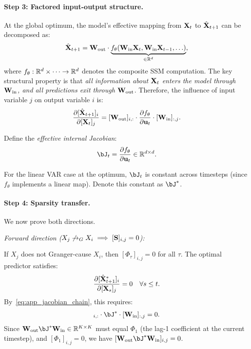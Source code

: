 \paragraph{Step 3: Factored input-output structure.}
At the global optimum, the model's effective mapping from $\mathbf{X}_t$ to
$\hat{\mathbf{X}}_{t+1}$ can be decomposed as:
\begin{equation}
    \hat{\mathbf{X}}_{t+1} = \mathbf{W}_{\text{out}} \cdot
    \underbrace{f_\theta(\mathbf{W}_{\text{in}} \mathbf{X}_t, \mathbf{W}_{\text{in}}
    \mathbf{X}_{t-1}, \ldots)}_{\in \mathbb{R}^d} ,
    \label{eq:app_factored}
\end{equation}
where $f_\theta: \mathbb{R}^d \times \cdots \to \mathbb{R}^d$ denotes the composite
SSM computation. The key structural property is that \emph{all
information about $\mathbf{X}_t$ enters the model through $\mathbf{W}_{\text{in}}$,
and all predictions exit through $\mathbf{W}_{\text{out}}$}. Therefore, the
influence of input variable $j$ on output variable $i$ is:
\begin{equation}
    \frac{\partial [\hat{\mathbf{X}}_{t+1}]_i}{\partial [\mathbf{X}_t]_j}
    = [\mathbf{W}_{\text{out}}]_{i,:} \cdot
    \frac{\partial f_\theta}{\partial \mathbf{u}_t}
    \cdot [\mathbf{W}_{\text{in}}]_{:,j}.
    \label{eq:app_jacobian_chain}
\end{equation}

Define the \emph{effective internal Jacobian}:
\begin{equation}
    \bJ_t = \frac{\partial f_\theta}{\partial \mathbf{u}_t}
    \in \R^{d \times d}.
\end{equation}

For the linear VAR case at the optimum, $\bJ_t$ is constant across
timesteps (since $f_\theta$ implements a linear map). Denote this
constant as $\bJ^*$.

\paragraph{Step 4: Sparsity transfer.}
We now prove both directions.

\emph{Forward direction
($X_j \not\to_G X_i \implies [\mathbf{S}]_{i,j} = 0$):}

If $X_j$ does not Granger-cause $X_i$, then
$[\Phi_\tau]_{i,j} = 0$ for all $\tau$. The optimal predictor
satisfies:
\begin{equation}
    \frac{\partial [\hat{\mathbf{X}}^*_{t+1}]_i}{\partial [\mathbf{X}_s]_j} = 0
    \quad \forall s \leq t.
\end{equation}
By~\eqref{eq:app_jacobian_chain}, this requires:
\begin{equation}
    [\bW_{\text{out}}]_{i,:} \cdot \bJ^* \cdot [\bW_{\text{in}}]_{:,j} = 0.
    \label{eq:app_zero_flow}
\end{equation}
Since $\bW_{\text{out}} \bJ^* \bW_{\text{in}} \in \R^{K \times K}$
must equal $\Phi_1$ (the lag-1 coefficient at the current timestep),
and $[\Phi_1]_{i,j} = 0$, we have
$[\bW_{\text{out}} \bJ^* \bW_{\text{in}}]_{i,j} = 0$.

